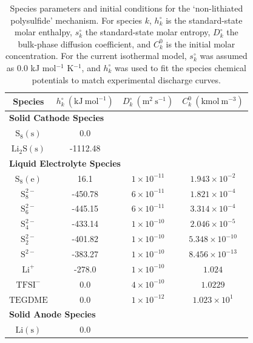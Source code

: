 \documentclass{elsarticle}
\begin{document}
\begin{table}[h!]
\begin{center}
 \begin{tabular}{cccc}
 \hline\hline
 Species & ${h}^\circ_k ~ \left(\mathrm{kJ} ~ \mathrm{mol}^{-1}\right)$  & ${D}^\circ_k ~ \left(\mathrm{m}^2 ~ \mathrm{s}^{-1}\right)$ & ${C}^0_{k} ~ \left(\mathrm{kmol} ~ \mathrm{m}^{-3}\right)$ \\
 \hline
 \multicolumn{4}{l}{\bf Solid Cathode Species}\\
 $\mathrm{S}_8(\mathrm{s})$ & 0.0 &  &  \\
 $\mathrm{Li}_2\mathrm{S}(\mathrm{s})$ & -1112.48  & &  \\
 \multicolumn{4}{l}{\bf Liquid Electrolyte Species}\\
 $\mathrm{S}_8(\mathrm{e})$ & 16.1  & $1 \times 10^{-11}$ & $1.943 \times 10^{-2}$ \\
 $\mathrm{S}_8^{2-}$ & -450.78  & $6 \times 10^{-11}$ & $1.821 \times 10^{-4}$ \\
 $\mathrm{S}_6^{2-}$ & -445.15  & $6 \times 10^{-11}$ & $3.314 \times 10^{-4}$ \\
 $\mathrm{S}_4^{2-}$ & -433.14  & $1 \times 10^{-10}$ & $2.046 \times 10^{-5}$ \\
 $\mathrm{S}_2^{2-}$ & -401.82 & $1 \times 10^{-10}$ & $5.348 \times 10^{-10}$ \\
 $\mathrm{S}^{2-}$ & -383.27  & $1 \times 10^{-10}$ & $8.456 \times 10^{-13}$ \\
 $\mathrm{Li}^+$ & -278.0 & $1 \times 10^{-10}$ & $1.024$ \\
 $\mathrm{TFSI}^-$ & 0.0 &  $4 \times 10^{-10}$ & $1.0229$ \\
 $\mathrm{TEGDME}$ & 0.0 &  $1 \times 10^{-12}$ & $1.023 \times 10^{1}$ \\
 \multicolumn{4}{l}{\bf Solid Anode Species}\\
  $\mathrm{Li}(\mathrm{s})$ & 0.0 & &  \\
 \hline\hline
\end{tabular}
\caption{Species parameters and initial conditions for the `non-lithiated polysulfide' mechanism. For species $k$, $h^\circ_k$ is the standard-state molar enthalpy, $s^\circ_k$ the standard-state molar entropy, $D^\circ_k$ the bulk-phase diffusion coefficient, and $C^0_k$ is the initial molar concentration. For the current isothermal model, $s^\circ_k$ was assumed as 0.0 kJ mol$^{-1}$ K$^{-1}$, and $h^\circ_k$ was used to fit the species chemical potentials to match experimental discharge curves.}
\label{tab:non_lithiated_thermo}
\end{center}
\end{table}
\end{document}
